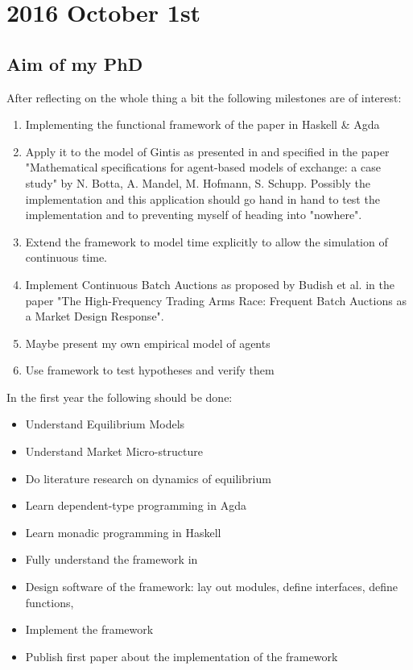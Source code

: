 \section*{2016 October 1st}
\subsection*{Aim of my PhD}
After reflecting on the whole thing a bit the following milestones are of interest:

\begin{enumerate}
\item Implementing the functional framework of the paper \cite{Botta20114025} in Haskell \& Agda
\item Apply it to the model of Gintis as presented in \cite{Gintis2006} and specified in the paper "Mathematical specifications for agent-based
models of exchange: a case study" by N. Botta, A. Mandel, M. Hofmann, S. Schupp. Possibly the implementation and this application should go hand in hand to test the implementation and to preventing myself of heading into "nowhere".
\item Extend the framework to model time explicitly to allow the simulation of continuous time.
\item Implement Continuous Batch Auctions as proposed by Budish et al. in the paper "The High-Frequency Trading Arms Race: Frequent Batch Auctions as a Market Design Response".
\item Maybe present my own empirical model of agents
\item Use framework to test hypotheses and verify them
\end{enumerate}

In the first year the following should be done:

\begin{itemize}
\item Understand Equilibrium Models
\item Understand Market Micro-structure
\item Do literature research on dynamics of equilibrium 
\item Learn dependent-type programming in Agda
\item Learn monadic programming in Haskell
\item Fully understand the framework in \cite{Botta20114025}
\item Design software of the framework: lay out modules, define interfaces, define functions,
\item Implement the framework
\item Publish first paper about the implementation of the framework
\end{itemize}